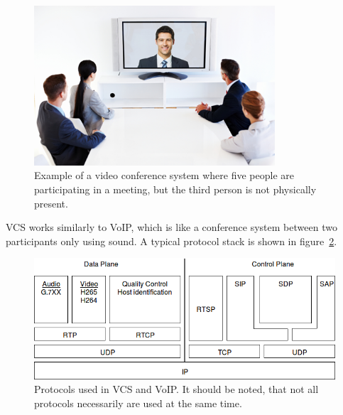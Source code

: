 \begin{figure}[H]
	\centering
	\includegraphics[width=0.8\textwidth]{figures/vcs_overview.png}
	\caption{Example of a video conference system where five people are participating in a meeting, but the third person is not physically present.} \label{fig:design:vcs}
\end{figure}

\ac{VCS} works similarly to \ac{VoIP}, which is like a conference system between two participants only using sound. A typical protocol stack is shown in figure~\ref{fig:design:protocolstack}. 

\begin{figure}[H]
	\centering
	\includegraphics[width=\textwidth]{figures/protocol_stack}
	\caption{Protocols used in VCS and VoIP. It should be noted, that not all protocols necessarily are used at the same time.}
	\label{fig:design:protocolstack}
\end{figure} 


